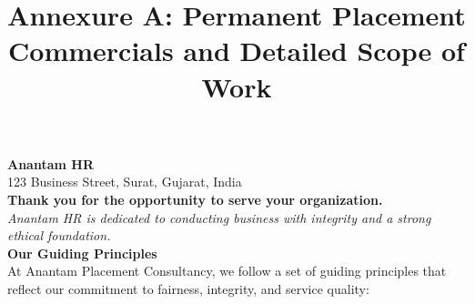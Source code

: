 \documentclass{article}
\title{\textbf{\color{primary} Annexure A: Permanent Placement Commercials and Detailed Scope of Work}}
\date{}
\begin{document}
\maketitle

\noindent\textbf{Anantam HR}\\
123 Business Street, Surat, Gujarat, India\\[1em]

\noindent\textbf{Thank you for the opportunity to serve your organization.}\\[0.5em]
\noindent\textit{Anantam HR is dedicated to conducting business with integrity and a strong ethical foundation.}\\[1em]

\noindent\textbf{\color{secondary} Our Guiding Principles}\\[0.5em]
\noindent At Anantam Placement Consultancy, we follow a set of guiding principles that reflect our commitment to fairness, integrity, and service quality:
\end{document}

